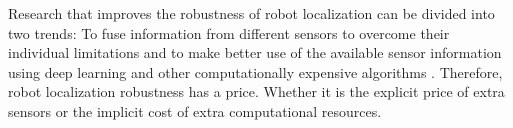 Research that improves the robustness of robot localization can be divided into
two trends: To fuse information from different sensors to overcome their
individual limitations \cite{Valente2019,Vargas2021,Ojeda2006} and to make
better use of the available sensor information using deep learning and other
computationally expensive algorithms \cite{Long2021,DFVO}. Therefore, robot
localization robustness has a price. Whether it is the explicit price of extra
sensors or the implicit cost of extra computational resources.